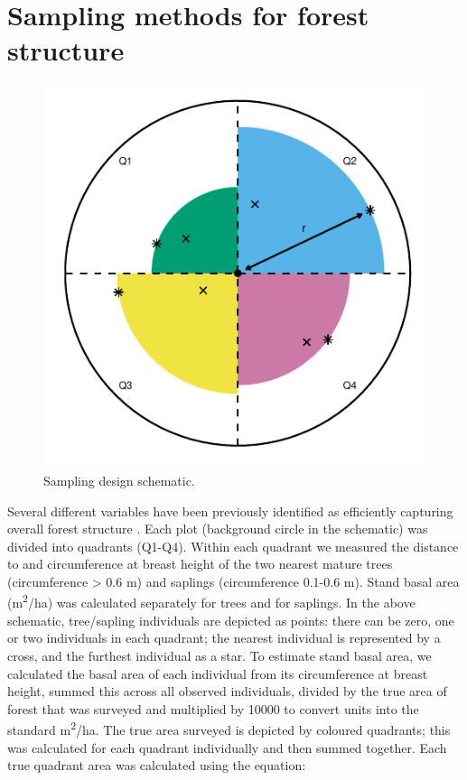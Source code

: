 \documentclass[12pt,a4paper,]{report}
\theoremstyle{definition}
\theoremstyle{definition}
\theoremstyle{definition}
\theoremstyle{remark}
\begin{document}
\section{Sampling methods for forest structure}\label{text-B-1}

\begin{figure}[H]

{\centering \includegraphics{./output/fig-B-1-1} 

}

\caption{Sampling design schematic.}\label{fig:fig-B-1}
\end{figure}

Several different variables have been previously identified as
efficiently capturing overall forest structure
\citep{hamer_ecology_2003, lucey_spillover_2012}. Each plot (background
circle in the schematic) was divided into quadrants (Q1-Q4). Within each
quadrant we measured the distance to and circumference at breast height
of the two nearest mature trees (circumference \textgreater{} 0.6 m) and
saplings (circumference 0.1-0.6 m). Stand basal area
(m\textsuperscript{2}/ha) was calculated separately for trees and for
saplings. In the above schematic, tree/sapling individuals are depicted
as points: there can be zero, one or two individuals in each quadrant;
the nearest individual is represented by a cross, and the furthest
individual as a star. To estimate stand basal area, we calculated the
basal area of each individual from its circumference at breast height,
summed this across all observed individuals, divided by the true area of
forest that was surveyed and multiplied by 10000 to convert units into
the standard m\textsuperscript{2}/ha. The true area surveyed is depicted
by coloured quadrants; this was calculated for each quadrant
individually and then summed together. Each true quadrant area was
calculated using the equation:
\end{document}
